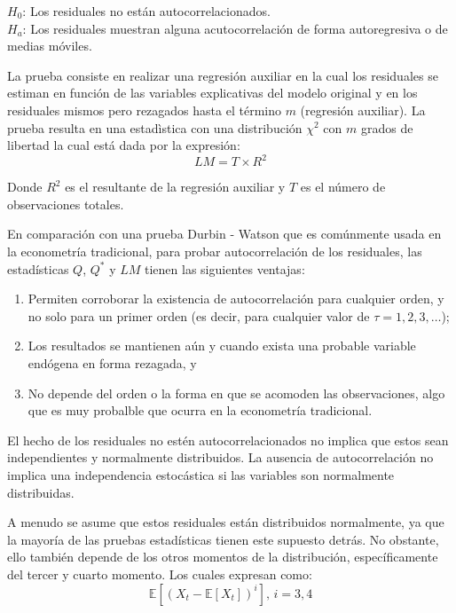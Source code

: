 \documentclass[
  a4paper,
]{article}
\begin{document}
\begin{center}
    $H_0$: Los residuales no están autocorrelacionados. \\
    $H_a$: Los residuales muestran alguna acutocorrelación de forma autoregresiva o de medias móviles.
\end{center}

La prueba consiste en realizar una regresión auxiliar en la cual los
residuales se estiman en función de las variables explicativas del
modelo original y en los residuales mismos pero rezagados hasta el
término \(m\) (regresión auxiliar). La prueba resulta en una estadìstica
con una distribución \(\chi^2\) con \(m\) grados de libertad la cual
está dada por la expresión: \[
    LM = T \times R^2
\]

Donde \(R^2\) es el resultante de la regresión auxiliar y \(T\) es el
número de observaciones totales.

En comparación con una prueba Durbin - Watson que es comúnmente usada en
la econometría tradicional, para probar autocorrelación de los
residuales, las estadísticas \(Q\), \(Q^*\) y \(LM\) tienen las
siguientes ventajas:

\begin{enumerate}
    \item Permiten corroborar la existencia de autocorrelación para cualquier orden, y no solo para un primer orden (es decir, para cualquier valor de $\tau = 1, 2, 3, \ldots$);
    \item Los resultados se mantienen aún y cuando exista una probable variable endógena en forma rezagada, y
    \item No depende del orden o la forma en que se acomoden las observaciones, algo que es muy probalble que ocurra en la econometría tradicional.
\end{enumerate}

El hecho de los residuales no estén autocorrelacionados no implica que
estos sean independientes y normalmente distribuidos. La ausencia de
autocorrelación no implica una independencia estocástica si las
variables son normalmente distribuidas.

A menudo se asume que estos residuales están distribuidos normalmente,
ya que la mayoría de las pruebas estadísticas tienen este supuesto
detrás. No obstante, ello también depende de los otros momentos de la
distribución, específicamente del tercer y cuarto momento. Los cuales
expresan como: \begin{equation*}
    \mathbb{E}[(X_t - \mathbb{E}[X_t])^i] \mbox{, } i = 3, 4
\end{equation*}
\end{document}
